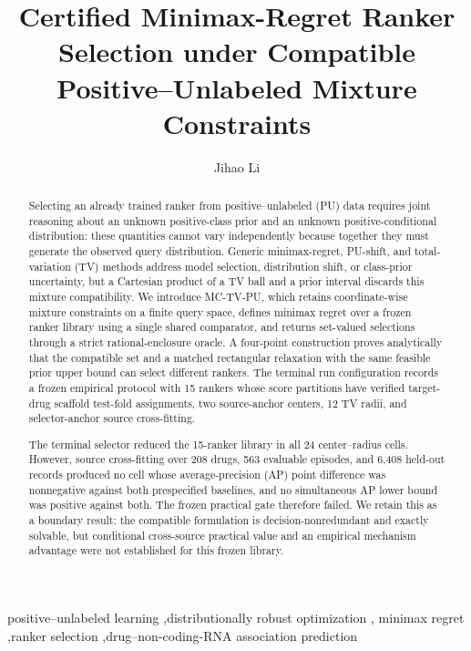 \documentclass[preprint,review,12pt]{elsarticle}
\newcommand{\AuthorPending}[1]{\textcolor{pendingred}{[AUTHOR INPUT REQUIRED: #1]}}
\begin{document}
\begin{frontmatter}

\title{Certified Minimax-Regret Ranker Selection under Compatible Positive--Unlabeled Mixture Constraints}

\author[aff1]{Jihao Li}
\cortext[cor1]{Corresponding author. \AuthorPending{email address}}
\address[aff1]{Independent Researcher, Shenzhen, Guangdong, China.
\AuthorPending{complete postal address}}

\begin{abstract}
Selecting an already trained ranker from positive--unlabeled (PU) data requires
joint reasoning about an unknown positive-class prior and an unknown
positive-conditional distribution: these quantities cannot vary independently
because together they must generate the observed query distribution. Generic
minimax-regret, PU-shift, and total-variation (TV) methods address model
selection, distribution shift, or class-prior uncertainty, but a Cartesian
product of a TV ball and a prior interval discards this mixture compatibility.
We introduce MC-TV-PU, which retains coordinate-wise mixture constraints on a
finite query space, defines minimax regret over a frozen ranker library using a
single shared comparator, and returns set-valued selections through a strict
rational-enclosure oracle. A four-point construction proves analytically that
the compatible set and a matched rectangular relaxation with the same feasible
prior upper bound can select different rankers. The terminal run configuration
records a frozen empirical protocol with 15 rankers whose score partitions have
verified target-drug scaffold test-fold assignments, two source-anchor centers,
12 TV radii, and selector-anchor source cross-fitting.

The terminal selector reduced the 15-ranker library in all 24 center--radius
cells. However, source cross-fitting over 208 drugs, 563 evaluable episodes,
and 6,408 held-out records produced no cell whose average-precision (AP) point
difference was nonnegative against both prespecified baselines, and no
simultaneous AP lower bound was positive against both. The frozen practical
gate therefore failed. We retain this as a boundary result: the compatible
formulation is decision-nonredundant and exactly solvable, but conditional
cross-source practical value and an empirical mechanism advantage were not
established for this frozen library.
\end{abstract}

\begin{keyword}
positive--unlabeled learning \sep distributionally robust optimization \sep
minimax regret \sep ranker selection \sep drug--non-coding-RNA association prediction
\end{keyword}

\end{frontmatter}
\end{document}

